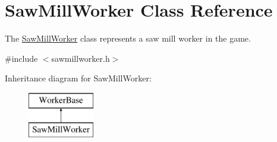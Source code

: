 \hypertarget{classSawMillWorker}{\section{Saw\-Mill\-Worker Class Reference}
\label{classSawMillWorker}
}


The \hyperlink{classSawMillWorker}{Saw\-Mill\-Worker} class represents a saw mill worker in the game.  




{\ttfamily \#include $<$sawmillworker.\-h$>$}

Inheritance diagram for Saw\-Mill\-Worker\-:\begin{figure}[H]
\begin{center}
\leavevmode
\includegraphics[height=2.000000cm]{classSawMillWorker}
\end{center}
\end{figure}
